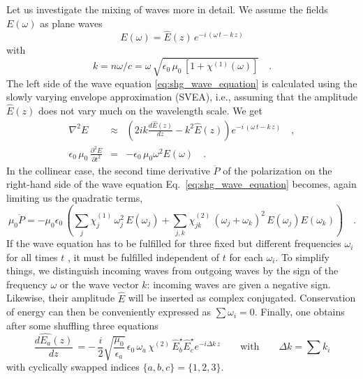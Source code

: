 Let us investigate the mixing of waves more in detail.
We assume the fields $E(\omega)$ as plane waves
\begin{equation}
  E(\omega) = \hat{E}(z) \, e^{-i \, (\omega \,
  t - k \, z)} 
\end{equation}
with
\begin{equation}
 k = n
  \omega / c = \omega \, \sqrt{\epsilon_0 \, \mu_0 \, [1+
  \chi^{(1)}(\omega)]} \quad.
\end{equation}
The left side of the wave equation
\ref{eq:shg_wave_equation} is calculated using the slowly varying envelope approximation (SVEA), i.e., assuming that 
 the amplitude $ \hat{E}(z)$ does not vary much on the wavelength scale. We get
\begin{eqnarray}
 \nabla^2 E & \approx &  \left( 2 i k \frac{d
 \hat{E}(z)}{dz} - k^2 \hat{E}(z) \right) e^{-i \, (\omega \,
  t - k \, z)}  \quad ,\label{eq:shg_nabla2E}\\
%
 \epsilon_0 \, \mu_0 \, \frac{\partial^2 E}{\partial t^2} &=& -   \epsilon_0 \,
 \mu_0 \omega^2 E(\omega)  \quad .\label{eq:shg_partial2E_t2}
\end{eqnarray}
%
In the collinear case, the second time derivative 
$\ddot{P}$ of the polarization on the right-hand side of the wave equation Eq.~\ref{eq:shg_wave_equation} becomes, again limiting us the quadratic terms, 
\begin{equation}
  \mu_0 \ddot{P} = - \mu_0 \epsilon_0 \, \left( \sum_j \chi^{(1)}_{j}\, \omega_j^2 \, E(\omega_j)
     + \sum_{j,k} \chi^{(2)}_{jk} \, (\omega_j + \omega_k)^2 \, E(\omega_j) E(\omega_k) \right) \quad .
     \label{eq:shg_ddot_p}
\end{equation}
If the wave equation  has to be fulfilled for
three fixed but different frequencies $\omega_i$ for all
times $t$ , it must be fulfilled independent of  $t$ for each
$\omega_i$. To simplify things, we distinguish 
incoming waves from outgoing waves by the sign of the
frequency $\omega$ or the wave vector $k$: 
incoming waves are given a negative sign.
Likewise, their amplitude $\hat{E}$ will be inserted as complex conjugated. Conservation of energy can then be conveniently expressed as $\sum
\omega_i = 0$. Finally, one obtains after some shuffling
 three
equations 
\begin{equation}
 \frac{d  \hat{E_a}(z)}{dz} \,
= %
- \, \frac{i}{2}   \sqrt{ \frac{\mu_0} {\epsilon_a}}\,\epsilon_0
  \, \omega_a \, \chi^{(2)} \, \hat{E}_b^{\star} \hat{E}_c^{\star}  e^{-i  \Delta k \, z}
  \qquad \text{with} \qquad \Delta k = \sum k_i
  \label{eq:shg_partial2E_t2}
\end{equation}
with  cyclically swapped  indices
$\{a,b,c\} = \{1,2,3\} $.

